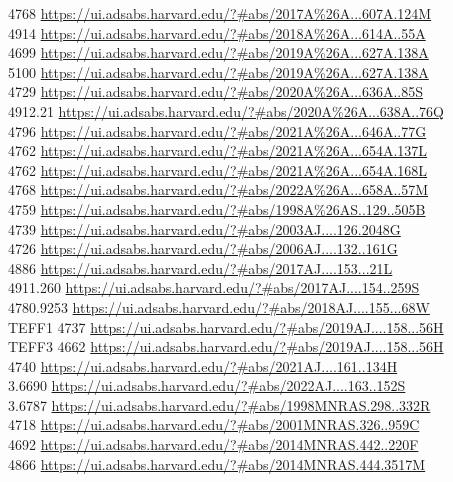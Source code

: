4768 \url{https://ui.adsabs.harvard.edu/?#abs/2017A%26A...607A.124M}\\
4914 \url{https://ui.adsabs.harvard.edu/?#abs/2018A%26A...614A..55A}\\
4699 \url{https://ui.adsabs.harvard.edu/?#abs/2019A%26A...627A.138A}\\
5100 \url{https://ui.adsabs.harvard.edu/?#abs/2019A%26A...627A.138A}\\
4729 \url{https://ui.adsabs.harvard.edu/?#abs/2020A%26A...636A..85S}\\
4912.21 \url{https://ui.adsabs.harvard.edu/?#abs/2020A%26A...638A..76Q}\\
4796 \url{https://ui.adsabs.harvard.edu/?#abs/2021A%26A...646A..77G}\\
4762 \url{https://ui.adsabs.harvard.edu/?#abs/2021A%26A...654A.137L}\\
4762 \url{https://ui.adsabs.harvard.edu/?#abs/2021A%26A...654A.168L}\\
4768 \url{https://ui.adsabs.harvard.edu/?#abs/2022A%26A...658A..57M}\\
4759 \url{https://ui.adsabs.harvard.edu/?#abs/1998A%26AS..129..505B}\\
4739 \url{https://ui.adsabs.harvard.edu/?#abs/2003AJ....126.2048G}\\
4726 \url{https://ui.adsabs.harvard.edu/?#abs/2006AJ....132..161G}\\
4886 \url{https://ui.adsabs.harvard.edu/?#abs/2017AJ....153...21L}\\
4911.260 \url{https://ui.adsabs.harvard.edu/?#abs/2017AJ....154..259S}\\
4780.9253 \url{https://ui.adsabs.harvard.edu/?#abs/2018AJ....155...68W}\\
TEFF1 4737 \url{https://ui.adsabs.harvard.edu/?#abs/2019AJ....158...56H}\\
TEFF3 4662 \url{https://ui.adsabs.harvard.edu/?#abs/2019AJ....158...56H}\\
4740 \url{https://ui.adsabs.harvard.edu/?#abs/2021AJ....161..134H}\\
3.6690 \url{https://ui.adsabs.harvard.edu/?#abs/2022AJ....163..152S}\\
3.6787 \url{https://ui.adsabs.harvard.edu/?#abs/1998MNRAS.298..332R}\\
4718 \url{https://ui.adsabs.harvard.edu/?#abs/2001MNRAS.326..959C}\\
4692 \url{https://ui.adsabs.harvard.edu/?#abs/2014MNRAS.442..220F}\\
4866 \url{https://ui.adsabs.harvard.edu/?#abs/2014MNRAS.444.3517M}\\
